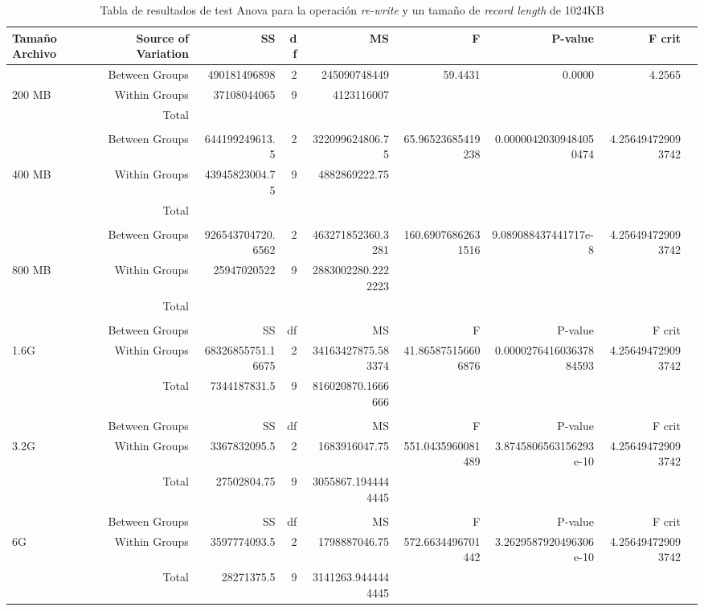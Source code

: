 \begin{landscape}
\begin{table}[!htp]\centering
\caption{Tabla de resultados de test Anova para la operación \textit{re-write} y un tamaño de \textit{record length} de 1024KB}\label{tab: }
\scriptsize
\begin{tabular}{lrrrrrrrr}\toprule
Tamaño Archivo &Source of Variation &SS &df &MS &F &P-value &F crit \\\midrule
&Between Groups &490181496898 &2 &245090748449 &59.4431 &0.0000 &4.2565 \\
200 MB &Within Groups &37108044065 &9 &4123116007 & & & \\
&Total & & & & & & \\
& & & & & & & \\
&Between Groups &644199249613.5 &2 &322099624806.75 &65.96523685419238 &0.00000420309484050474 &4.256494729093742 \\
400 MB &Within Groups &43945823004.75 &9 &4882869222.75 & & & \\
&Total & & & & & & \\
& & & & & & & \\
&Between Groups &926543704720.6562 &2 &463271852360.3281 &160.69076862631516 &9.089088437441717e-8 &4.256494729093742 \\
800 MB &Within Groups &25947020522 &9 &2883002280.2222223 & & & \\
&Total & & & & & & \\
& & & & & & & \\
&Between Groups &SS &df &MS &F &P-value &F crit \\
1.6G &Within Groups &68326855751.16675 &2 &34163427875.583374 &41.865875156606876 &0.000027641603637884593 &4.256494729093742 \\
&Total &7344187831.5 &9 &816020870.1666666 & & & \\
& & & & & & & \\
&Between Groups &SS &df &MS &F &P-value &F crit \\
3.2G &Within Groups &3367832095.5 &2 &1683916047.75 &551.0435960081489 &3.8745806563156293e-10 &4.256494729093742 \\
&Total &27502804.75 &9 &3055867.1944444445 & & & \\
& & & & & & & \\
&Between Groups &SS &df &MS &F &P-value &F crit \\
6G &Within Groups &3597774093.5 &2 &1798887046.75 &572.6634496701442 &3.2629587920496306e-10 &4.256494729093742 \\
&Total &28271375.5 &9 &3141263.9444444445 & & & \\
\bottomrule
\end{tabular}
\end{table}
\end{landscape}


